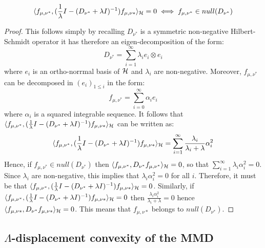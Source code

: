 \begin{proposition}\label{prop:null_space_diff_operator}
	 \[\langle f_{\mu,\nu^{*}}, (\frac{1}{\lambda}I - (D_{\nu^{*}} +\lambda I )^{-1})f_{\mu,\nu{*}} \rangle_{{{\mathcal H}}} = 0 \iff f_{\mu,\nu^{*}} \in null(D_{\nu^{*}})
	 \]
\end{proposition}
\begin{proof}
	This follows simply by recalling $D_{\nu^{*}}$ is a symmetric non-negative Hilbert-Schmidt operator it has therefore an eigen-decomposition of the form:
	\[
	D_{\nu^{*}}  = \sum_{i=1}^{\infty} \lambda_i e_i \otimes e_i
 	\]
 	where $e_i$ is an ortho-norrmal basis of ${{\mathcal H}}$ and $\lambda_i$ are non-negative. Moreover, $f_{\mu,\nu^{*}}$ can be decomposed in $(e_i)_{1\leq i}$ in the form:
 	\[
 	f_{\mu,\nu^{*}} = \sum_{i=0}^{\infty} \alpha_i e_i
 	\]
 	where $\alpha_i$ is a squared integrable sequence. It follows that $\langle f_{\mu,\nu^{*}}, (\frac{1}{\lambda}I - (D_{\nu^{*}} +\lambda I )^{-1})f_{\mu,\nu{*}} \rangle_{{{\mathcal H}}}$ can be written as:
 	\[
 	\langle f_{\mu,\nu^{*}}, (\frac{1}{\lambda}I - (D_{\nu^{*}} +\lambda I )^{-1})f_{\mu,\nu{*}} \rangle_{{{\mathcal H}}} = \sum_{i=1}^{\infty} \frac{\lambda_i}{\lambda_i+\lambda} \alpha_i^2
 	\]
 	Hence, if $f_{\mu,\nu^{*}}\in null(D_{\nu^{*}})$ then $\langle f_{\mu,\nu^{*}}, D_{\nu^{*}}f_{\mu,\nu^{*}}\rangle_{{{\mathcal H}}}= 0$, so that $\sum_{i=1}^{\infty} \lambda_i \alpha_i^2 = 0$. Since $\lambda_i$ are non-negative, this implies that $\lambda_i \alpha_i^2= 0$ for all $i$. Therefore, it must be that $\langle f_{\mu,\nu^{*}}, (\frac{1}{\lambda}I - (D_{\nu^{*}} +\lambda I )^{-1})f_{\mu,\nu{*}} \rangle_{{{\mathcal H}}}  = 0$.
 	Similarly, if $\langle f_{\mu,\nu^{*}}, (\frac{1}{\lambda}I - (D_{\nu^{*}} +\lambda I )^{-1})f_{\mu,\nu{*}} \rangle_{{{\mathcal H}}}  =0 $ then $\frac{\lambda_i\alpha_i^2}{\lambda_i + \lambda} = 0$ hence $\langle f_{\mu,\nu{*}}, D_{\nu^{*}} f_{\mu,\nu{*}} \rangle_{{{\mathcal H}}} = 0$. This means that $f_{\mu,\nu{*}}$ belongs to $null(D_{\nu^*})$.
\end{proof}



\subsection{$\Lambda$-displacement convexity of the MMD}\label{subsec:appendix_lambda_convexity}

